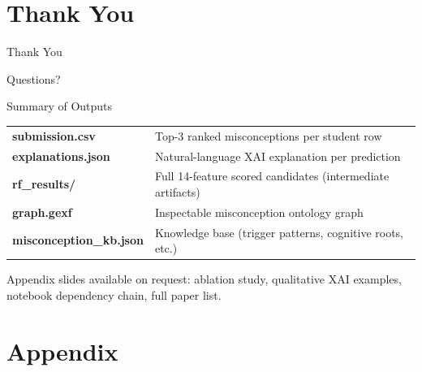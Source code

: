 \documentclass[aspectratio=169]{beamer}
\begin{document}
\section{Thank You}
\begin{frame}{Thank You}
\begin{center}
{\Large Questions?}

\vspace{1.2em}

\begin{block}{Summary of Outputs}
\begin{tabular}{ll}
\textbf{submission.csv} & Top-3 ranked misconceptions per student row\\
\textbf{explanations.json} & Natural-language XAI explanation per prediction\\
\textbf{rf\_results/} & Full 14-feature scored candidates (intermediate artifacts)\\
\textbf{graph.gexf} & Inspectable misconception ontology graph\\
\textbf{misconception\_kb.json} & Knowledge base (trigger patterns, cognitive roots, etc.)\\
\end{tabular}
\end{block}

\vspace{1em}
{\small Appendix slides available on request: ablation study, qualitative XAI examples, notebook dependency chain, full paper list.}
\end{center}
\end{frame}

\appendix
\section{Appendix}
\end{document}
